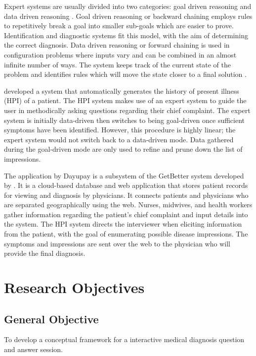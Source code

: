 Expert systems are usually divided into two categories: goal driven reasoning and data driven reasoning \cite{Merritt:2010}. 
Goal driven reasoning or backward chaining employs rules to repetitively break a goal into smaller sub-goals which are easier to prove. 
Identification and diagnostic systems fit this model, with the aim of determining the correct diagnosis. 
Data driven reasoning or forward chaining is used in configuration problems where inputs vary and can be combined in an almost infinite number of ways. 
The system keeps track of the current state of the problem and identifies rules which will move the state closer to a final solution .

 developed a system that automatically generates the history of present illness (HPI) of a patient.
The HPI system makes use of an expert system to guide the user in methodically asking questions regarding their chief complaint. 
The expert system is initially data-driven then switches to being goal-driven once sufficient symptoms have been identified.
However, this procedure is highly linear; the expert system would not switch back to a data-driven mode.
Data gathered during the goal-driven mode are only used to refine and prune down the list of impressions.

The application by Dayupay is a subsystem of the GetBetter system developed by .
It is a cloud-based database and web application that stores patient records for viewing and diagnosis by physicians.
It connects patients and physicians who are separated geographically using the web.
Nurses, midwives, and health workers gather information regarding the patient's chief complaint and input details into the system.
The HPI system directs the interviewer when eliciting information from the patient, with the goal of enumerating possible disease impressions.
The symptoms and impressions are sent over the web to the physician who will provide the final diagnosis.    

\section{Research Objectives}
\label{sec:researchobjectives}

\subsection{General Objective}
\label{sec:generalobjective}

To develop a conceptual framework for a interactive medical diagnosis question and answer session.

